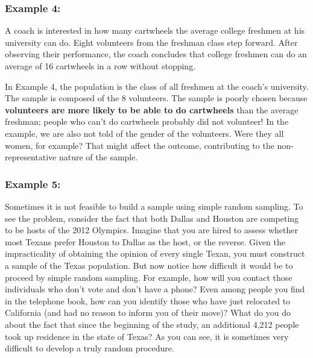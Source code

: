 {	\subsubsection{Example 4:} A coach is interested in how many cartwheels the average
	college freshmen at his university can do. Eight volunteers from the
	freshman class step forward. After observing their performance, the coach
	concludes that college freshmen can do an average of 16 cartwheels in a row
	without stopping.
	
	In Example 4, the population is the class of all freshmen at the coach's university.
	The sample is composed of the 8 volunteers. The sample is poorly chosen because
	\textbf{volunteers are more likely to be able to do cartwheels} than the average freshman;
	people who can't do cartwheels probably did not volunteer! In the example, we are
	also not told of the gender of the volunteers. Were they all women, for example?
	That might affect the outcome, contributing to the non-representative nature of the
	sample.
	\subsubsection{Example 5:} 
	Sometimes it is not feasible to build a sample using simple random sampling. To
	see the problem, consider the fact that both Dallas and Houston are competing to
	be hosts of the 2012 Olympics. Imagine that you are hired to assess whether most
	Texans prefer Houston to Dallas as the host, or the reverse. Given the
	impracticality of obtaining the opinion of every single Texan, you must construct a
	sample of the Texas population. But now notice how difficult it would be to
	proceed by simple random sampling. For example, how will you contact those
	individuals who don’t vote and don’t have a phone? Even among people you find
	in the telephone book, how can you identify those who have just relocated to
	California (and had no reason to inform you of their move)? What do you do about
	the fact that since the beginning of the study, an additional 4,212 people took up
	residence in the state of Texas? As you can see, it is sometimes very difficult to
	develop a truly random procedure.
	
}
